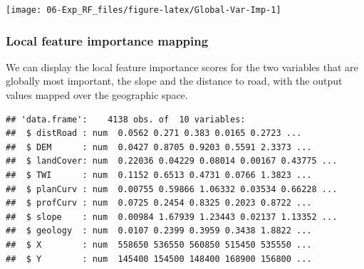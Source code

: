 \documentclass[
]{article}
\newenvironment{Shaded}{\begin{snugshade}}{\end{snugshade}}
\newcommand{\CommentTok}[1]{\textcolor[rgb]{0.56,0.35,0.01}{\textit{#1}}}
\newcommand{\DecValTok}[1]{\textcolor[rgb]{0.00,0.00,0.81}{#1}}
\newcommand{\FunctionTok}[1]{\textcolor[rgb]{0.13,0.29,0.53}{\textbf{#1}}}
\newcommand{\NormalTok}[1]{#1}
\newcommand{\OtherTok}[1]{\textcolor[rgb]{0.56,0.35,0.01}{#1}}
\newcommand{\SpecialCharTok}[1]{\textcolor[rgb]{0.81,0.36,0.00}{\textbf{#1}}}
\newcommand{\StringTok}[1]{\textcolor[rgb]{0.31,0.60,0.02}{#1}}
\begin{document}
\begin{center}\texttt{[image: 06-Exp\_RF\_files/figure-latex/Global-Var-Imp-1]} \end{center}

\subsubsection{Local feature importance mapping}\label{local-feature-importance-mapping}

We can display the local feature importance scores for the two variables that are globally most important, the slope and the distance to road, with the output values mapped over the geographic space.

\begin{Shaded}
\end{Shaded}

\begin{verbatim}
## 'data.frame':    4138 obs. of  10 variables:
##  $ distRoad : num  0.0562 0.271 0.383 0.0165 0.2723 ...
##  $ DEM      : num  0.0427 0.8705 0.9203 0.5591 2.3373 ...
##  $ landCover: num  0.22036 0.04229 0.08014 0.00167 0.43775 ...
##  $ TWI      : num  0.1152 0.6513 0.4731 0.0766 1.3823 ...
##  $ planCurv : num  0.00755 0.59866 1.06332 0.03534 0.66228 ...
##  $ profCurv : num  0.0725 0.2454 0.8325 0.2023 0.8722 ...
##  $ slope    : num  0.00984 1.67939 1.23443 0.02137 1.13352 ...
##  $ geology  : num  0.0107 0.2399 0.3959 0.3438 1.8822 ...
##  $ X        : num  558650 536550 560850 515450 535550 ...
##  $ Y        : num  145400 154500 148400 168900 156800 ...
\end{verbatim}
\end{document}
